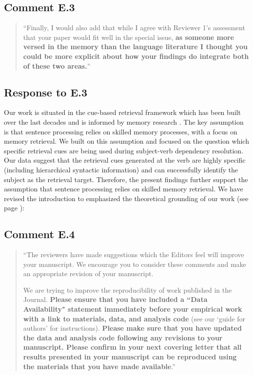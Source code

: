 \documentclass[12pt]{article}
\begin{document}
\setcounter{figure}{10}

\subsection*{Comment E.3}
\begin{quote}
``Finally, I would also add that while I agree with Reviewer 1's assessment that your paper would fit well in the special issue, \textbf{as someone more versed in the memory than the language literature I thought you could be more explicit about how your findings do integrate both of these two areas.}''
\end{quote}

\subsection*{Response to E.3}
Our work is situated in the cue-based retrieval framework which has been built over the last decades \citep{Lewis2005, mcelree} and is informed by memory research \citep[see e.g., ][]{anderson_etal_2004_ACT_R}. The key assumption is that sentence processing relies on skilled memory processes, with a focus on memory retrieval. We built on this assumption and focused on the question which specific retrieval cues are being used during subject-verb dependency resolution. Our data suggest that the retrieval cues generated at the verb are highly specific (including hierarchical syntactic information) and can successfully identify the subject as the retrieval target. Therefore, the present findings further support the assumption that sentence processing relies on skilled memory retrieval. We have revised the introduction to emphasized the theoretical grounding of our work (see page \pageref{intro}):

\begin{quote}
\end{quote}

\subsection*{Comment E.4}
\begin{quote}
``The reviewers have made suggestions which the Editors feel will improve your manuscript. We encourage you to consider these comments and make an appropriate revision of your manuscript.

We are trying to improve the reproducibility of work published in the Journal. \textbf{Please ensure that you have included a ``Data Availability" statement immediately before your empirical work with a link to materials, data, and analysis code} (see our `guide for authors' for instructions). \textbf{Please make sure that you have updated the data and analysis code following any revisions to your manuscript. Please confirm in your next covering letter that all results presented in your manuscript can be reproduced using the materials that you have made available}.''
\end{quote}
\end{document}
